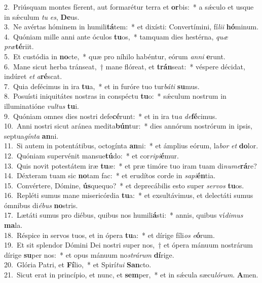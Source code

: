 {2.~}Priúsquam montes fíerent, aut formarétur terra et \textbf{or}bis:~* a sǽculo et usque in sǽculum \textit{tu} \textit{es}, \textbf{De}us.\\
{3.~}Ne avértas hóminem in humili\textbf{tá}tem:~* et dixísti: Convertímini, fí\textit{li}\textit{i} \textbf{hó}minum.\\
{4.~}Quóniam mille anni ante óculos \textbf{tu}os,~* tamquam dies hestérna, \textit{quæ} \textit{præ}\textbf{té}riit.\\
{5.~}Et custódia in \textbf{no}cte,~* quæ pro níhilo habéntur, eórum \textit{an}\textit{ni} \textbf{e}runt.\\
{6.~}Mane sicut herba tránseat,~† mane flóreat, et \textbf{trán}seat:~* véspere décidat, indúret \textit{et} \textit{a}\textbf{ré}scat.\\
{7.~}Quia defécimus in ira \textbf{tu}a,~* et in furóre tuo tur\textit{bá}\textit{ti} \textbf{su}mus.\\
{8.~}Posuísti iniquitátes nostras in conspéctu \textbf{tu}o:~* sǽculum nostrum in illuminatióne \textit{vul}\textit{tus} \textbf{tu}i.\\
{9.~}Quóniam omnes dies nostri defe\textbf{cé}runt:~* et in ira tu\textit{a} \textit{de}\textbf{fé}cimus.\\
{10.~}Anni nostri sicut aránea medita\textbf{bún}tur:~* dies annórum nostrórum in ipsis, septua\textit{gín}\textit{ta} \textbf{an}ni.\\
{11.~}Si autem in potentátibus, octogínta \textbf{an}ni:~* et ámplius eórum, la\textit{bor} \textit{et} \textbf{do}lor.\\
{12.~}Quóniam supervénit mansue\textbf{tú}do:~* et cor\textit{ri}\textit{pi}\textbf{é}mur.\\
{13.~}Quis novit potestátem iræ \textbf{tu}æ:~* et præ timóre tuo iram tuam di\textit{nu}\textit{me}\textbf{rá}re?\\
{14.~}Déxteram tuam sic \textbf{no}tam fac:~* et erudítos corde in \textit{sa}\textit{pi}\textbf{én}tia.\\
{15.~}Convértere, Dómine, \textbf{ús}quequo?~* et deprecábilis esto super \textit{ser}\textit{vos} \textbf{tu}os.\\
{16.~}Repléti sumus mane misericórdia \textbf{tu}a:~* et exsultávimus, et delectáti sumus ómnibus di\textit{é}\textit{bus} \textbf{no}stris.\\
{17.~}Lætáti sumus pro diébus, quibus nos humili\textbf{á}sti:~* annis, quibus ví\textit{di}\textit{mus} \textbf{ma}la.\\
{18.~}Réspice in servos tuos, et in ópera \textbf{tu}a:~* et dírige fíli\textit{os} \textit{e}\textbf{ó}rum.\\
{19.~}Et sit splendor Dómini Dei nostri super nos,~† et ópera mánuum nostrárum dírige \textbf{su}per nos:~* et opus mánuum no\textit{strá}\textit{rum} \textbf{dí}rige.\\
{20.~}Glória Patri, et \textbf{Fí}lio,~* et Spirí\textit{tu}\textit{i} \textbf{San}cto.\\
{21.~}Sicut erat in princípio, et nunc, et \textbf{sem}per,~* et in sǽcula sæcu\textit{ló}\textit{rum}. \textbf{A}men.\\
